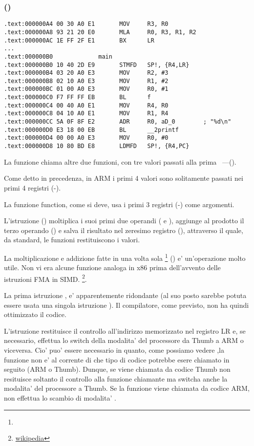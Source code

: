 \subsubsection{\NonOptimizingKeilVI (\ARMMode)}

\begin{lstlisting}[style=customasmARM]
.text:000000A4 00 30 A0 E1       MOV     R3, R0
.text:000000A8 93 21 20 E0       MLA     R0, R3, R1, R2
.text:000000AC 1E FF 2F E1       BX      LR
...
.text:000000B0             main
.text:000000B0 10 40 2D E9       STMFD   SP!, {R4,LR}
.text:000000B4 03 20 A0 E3       MOV     R2, #3
.text:000000B8 02 10 A0 E3       MOV     R1, #2
.text:000000BC 01 00 A0 E3       MOV     R0, #1
.text:000000C0 F7 FF FF EB       BL      f
.text:000000C4 00 40 A0 E1       MOV     R4, R0
.text:000000C8 04 10 A0 E1       MOV     R1, R4
.text:000000CC 5A 0F 8F E2       ADR     R0, aD_0        ; "%d\n"
.text:000000D0 E3 18 00 EB       BL      __2printf
.text:000000D4 00 00 A0 E3       MOV     R0, #0
.text:000000D8 10 80 BD E8       LDMFD   SP!, {R4,PC}
\end{lstlisting}

La funzione \main chiama altre due funzioni, con tre valori passati alla prima ~---(\ttf).

Come detto in precedenza, in ARM i primi 4 valori sono solitamente passati nei primi 4 registri (-).

La funzione \ttf function, come si deve, usa i primi 3 registri (-) come argomenti.

L'istruzione  () 
moltiplica i suoi primi due operandi ( e ), aggiunge al prodotto il terzo operando () e salva il risultato
nel zeresimo registro (), attraverso il quale, da standard, le funzioni restituiscono i valori.

La moltiplicazione e addizione fatte in una volta sola \footnote{\WPMAO} () e' un'operazione molto utile. 
Non vi era alcune funzione analoga in x86 prima dell'avvento delle istruzioni FMA in SIMD.
\footnote{\href{http://go.yurichev.com/17103}{wikipedia}}.

La prima istruzione , 
e' apparentemente ridondante (al suo posto sarebbe potuta essere usata una singola istruzione ). 
Il compilatore, come previsto, non ha quindi ottimizzato il codice.


L'istruzione  restituisce il controllo all'indirizzo memorizzato nel registro \ac{LR} e, se necessario, 
effettua lo switch della modalita' del processore da Thumb a ARM o viceversa.
Cio' puo' essere necessario in quanto, come possiamo vedere ,la funzione \ttf non e' al corrente di che tipo di codice potrebbe esere chiamato in seguito (ARM o Thumb).
Dunque, se viene chiamata da codice Thumb  non resituisce soltanto il controllo alla funzione chiamante ma switcha anche la modalita' del processore a Thumb. 
Se la funzione viene chiamata da codice ARM, non effettua lo scambio di modalita' .
